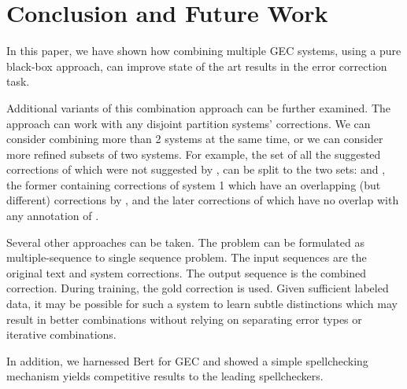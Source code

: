 \documentclass[11pt,a4paper]{article}
\begin{document}
   \section{Conclusion and Future Work} \label{sec:discussion}
   
 In this paper, we have shown how combining multiple GEC systems, using a pure black-box approach, can improve state of the art results in the error correction task.  
 
 Additional variants of this combination approach can be further examined.  The approach can work with any disjoint partition  systems' corrections.  We can consider combining more than 2 systems at the same time, or we can consider more refined subsets of two systems.  For example, the set  of all the suggested corrections of  which were not suggested by , can be split to the two sets:  and  , the former containing corrections of system 1 which have an overlapping (but different) corrections by , and the later corrections of  which have no overlap with any annotation of .

 Several other approaches can be taken. The problem can be formulated as multiple-sequence to single sequence problem. The input sequences are the original text and  system corrections.  The output sequence is the combined correction.  During training, the gold correction is used.   Given sufficient labeled data, it may be possible for such a system to learn subtle distinctions which may result in better combinations without relying on separating error types or iterative combinations.
 
 In addition, we harnessed Bert for GEC and showed a simple spellchecking mechanism yields competitive results to the leading spellcheckers.
  






\end{document}
